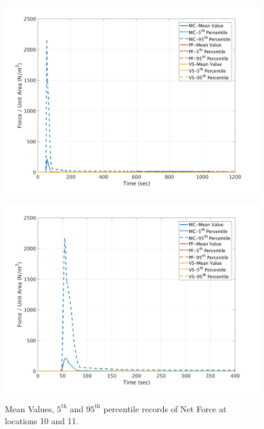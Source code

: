 \documentclass[a4paper,10pt]{article}
\begin{document}
\begin{figure}[H]
	\begin{minipage}[b]{0.5\linewidth}
	\centering
    \includegraphics[width=1\textwidth]{NetFAll/NetF11All.png}     
        \label{fig:NF11}
	\end{minipage}
	\begin{minipage}[b]{0.5\linewidth}
	\centering
    \includegraphics[width=1\textwidth]{NetFAll/NetF11All_z.png}
        \label{fig:NF11zoom}
	\end{minipage}
	
	\caption{Mean Values, $5^{\mathrm{th}}$ and $95^{\mathrm{th}}$ percentile records of Net Force at locations 10 and 11.}\label{fig:NF1011}	
\end{figure}



\end{document}

